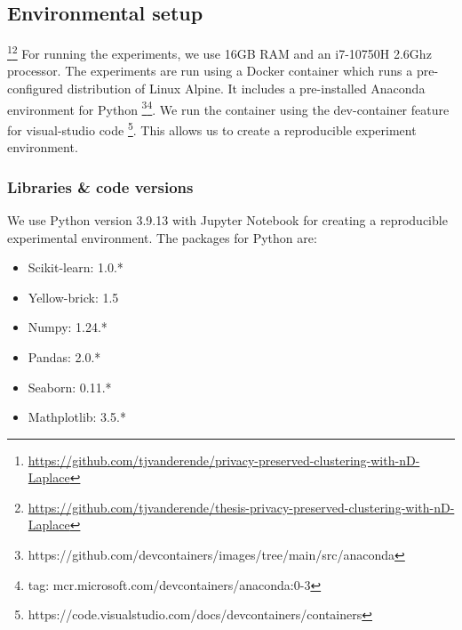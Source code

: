 \subsection{Environmental setup}
 \footnote{\url{https://github.com/tjvanderende/privacy-preserved-clustering-with-nD-Laplace}}\footnote{\url{https://github.com/tjvanderende/thesis-privacy-preserved-clustering-with-nD-Laplace}}
For running the experiments, we use 16GB RAM and an i7-10750H 2.6Ghz processor.
The experiments are run using a Docker container which runs a pre-configured distribution of Linux Alpine.
It includes a pre-installed Anaconda environment for Python \footnote{https://github.com/devcontainers/images/tree/main/src/anaconda}\footnote{tag: mcr.microsoft.com/devcontainers/anaconda:0-3}. \newpage
We run the container using the dev-container feature for visual-studio code \footnote{https://code.visualstudio.com/docs/devcontainers/containers}.
This allows us to create a reproducible experiment environment.
\subsubsection{Libraries \& code versions}
We use Python version 3.9.13 with Jupyter Notebook for creating a reproducible experimental environment.
The packages for Python are:
\begin{itemize}
    \item Scikit-learn: 1.0.*
    \item Yellow-brick: 1.5
    \item Numpy: 1.24.*
    \item Pandas: 2.0.*
    \item Seaborn: 0.11.*
    \item Mathplotlib: 3.5.*
\end{itemize}

